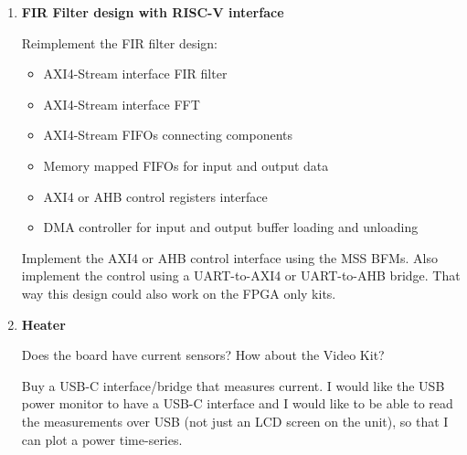 \begin{enumerate}
\item \textbf{FIR Filter design with RISC-V interface}

Reimplement the FIR filter design:
\begin{itemize}
\item AXI4-Stream interface FIR filter
\item AXI4-Stream interface FFT
\item AXI4-Stream FIFOs connecting components
\item Memory mapped FIFOs for input and output data
\item AXI4 or AHB control registers interface
\item DMA controller for input and output buffer loading and unloading
\end{itemize}
%
Implement the AXI4 or AHB control interface using the MSS BFMs.
Also implement the control using a UART-to-AXI4 or UART-to-AHB bridge.
That way this design could also work on the FPGA only kits.

\item \textbf{Heater}

Does the board have current sensors? How about the Video Kit?

Buy a USB-C interface/bridge that measures current. I would like the USB power
monitor to have a USB-C interface and I would like to be able to read the
measurements over USB (not just an LCD screen on the unit), so that I can
plot a power time-series.

\end{enumerate}

